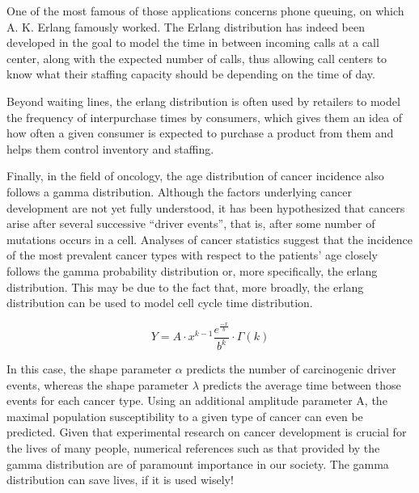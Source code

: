 \documentclass[12pt]{article}
\begin{document}
One of the most famous of those applications concerns phone queuing, on which A. K. Erlang famously worked. The Erlang
distribution has indeed been developed in the goal to model the time in between incoming calls at a call center, along
with the expected number of calls, thus allowing call centers to know what their staffing capacity should be depending
on the time of day.

Beyond waiting lines, the erlang distribution is often used by retailers to model the frequency of interpurchase times
by consumers, which gives them an idea of how often a given consumer is expected to purchase a product from them and
helps them control inventory and staffing.

Finally, in the field of oncology, the age distribution of cancer incidence also follows a gamma distribution. Although
the factors underlying cancer development are not yet fully understood, it has been hypothesized that cancers arise
after several successive “driver events”, that is, after some number of mutations occurs in a cell. Analyses of cancer
statistics suggest that the incidence of the most prevalent cancer types with respect to the patients' age closely
follows the gamma probability distribution or, more specifically, the erlang distribution. This may be due to the fact
that, more broadly, the erlang distribution can be used to model cell cycle time distribution.

\begin{equation}
	Y = A\cdot x^{k-1}\frac{e^{\frac{-x}{b}}}{b^k}\cdot\Gamma(k)
\end{equation}

In this case, the shape parameter $\alpha$ predicts the number of carcinogenic driver events, whereas the shape
parameter $\lambda$ predicts the average time between those events for each cancer type. Using an additional amplitude
parameter A, the maximal population susceptibility to a given type of cancer can even be predicted. Given that
experimental research on cancer development is crucial for the lives of many people, numerical references such as that
provided by the gamma distribution are of paramount importance in our society. The gamma distribution can save lives, if
it is used wisely!

\pagebreak
\end{document}
